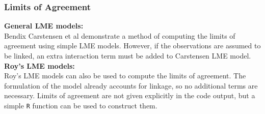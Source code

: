 %
%
\begin{frame}\frametitle{Limits of Agreement}
\textbf{General LME models:}\\
Bendix Carstensen et al demonstrate a method of computing the limits of agreement using simple LME models. However, if the observations are assumed to be linked, an extra interaction term must be added to Carstensen LME model.\\
\vspace{0.2cm}
\textbf{Roy's LME models:}\\
Roy's LME models can also be used to compute the limits of agreement. The formulation of the model already accounts for linkage, so no additional terms are necessary.
\vspace{0.1cm}Limits of agreement are not given explicitly in the code output, but a simple \texttt{R} function can be used to construct them.
\end{frame}








